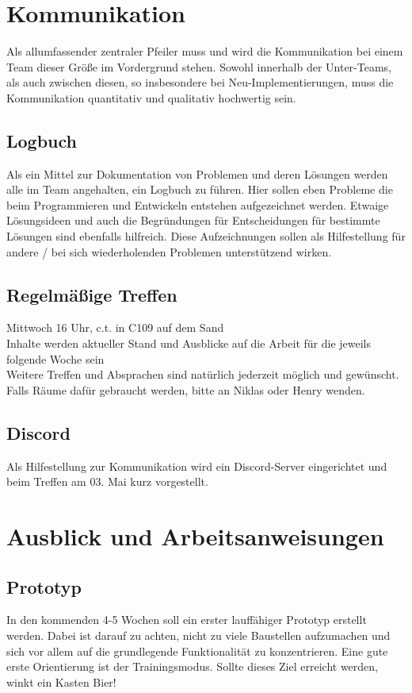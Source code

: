 \documentclass{article}
\begin{document}
\section*{Kommunikation}
Als allumfassender zentraler Pfeiler muss und wird die Kommunikation bei einem Team dieser Größe im Vordergrund stehen. Sowohl innerhalb der Unter-Teams, als auch zwischen diesen, so insbesondere bei Neu-Implementierungen, muss die Kommunikation quantitativ und qualitativ hochwertig sein.
\subsection*{Logbuch}
Als ein Mittel zur Dokumentation von Problemen und deren Lösungen werden alle im Team angehalten, ein Logbuch zu führen. Hier sollen eben Probleme die beim Programmieren und Entwickeln entstehen aufgezeichnet werden. Etwaige Lösungsideen und auch die Begründungen für Entscheidungen für bestimmte Lösungen sind ebenfalls hilfreich. Diese Aufzeichnungen sollen als Hilfestellung für andere / bei sich wiederholenden Problemen unterstützend wirken.
\subsection*{Regelmäßige Treffen}
Mittwoch 16 Uhr, c.t. in C109 auf dem Sand\\
Inhalte werden aktueller Stand und Ausblicke auf die Arbeit für die jeweils folgende Woche sein\\
Weitere Treffen und Absprachen sind natürlich jederzeit möglich und gewünscht. Falls Räume dafür gebraucht werden, bitte an Niklas oder Henry wenden.
\subsection*{Discord}
Als Hilfestellung zur Kommunikation wird ein Discord-Server eingerichtet und beim Treffen am 03. Mai kurz vorgestellt.

\section*{Ausblick und Arbeitsanweisungen}
\subsection*{Prototyp}
In den kommenden 4-5 Wochen soll ein erster lauffähiger Prototyp erstellt werden. Dabei ist darauf zu achten, nicht zu viele Baustellen aufzumachen und sich vor allem auf die grundlegende Funktionalität zu konzentrieren. Eine gute erste Orientierung ist der Trainingsmodus. Sollte dieses Ziel erreicht werden, winkt ein Kasten Bier!
\end{document}
